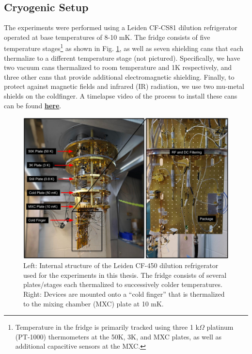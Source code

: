 

\subsection{Cryogenic Setup}

The experiments were performed using a Leiden CF-CS81 dilution refrigerator operated at base temperatures of 8-10 mK. The fridge consists of five temperature stages\footnote{Temperature in the fridge is primarily tracked using three 1 k$\Omega$ platinum (PT-1000) thermometers at the 50K, 3K, and MXC plates, as well as additional capacitive sensors at the MXC. } as shown in Fig. \ref{fig:4-fridge-wiring}, as well as seven shielding cans that each thermalize to a different temperature stage (not pictured). Specifically, we have two vacuum cans thermalized to room temperature and 1K respectively, and three other cans that provide additional electromagnetic shielding. Finally, to protect against magnetic fields and infrared (IR) radiation, we use two mu-metal shields on the coldfinger. A timelapse video of the process to install these cans can be found \href{https://youtu.be/KkvUc9Aw77s?t=829}{\textbf{here}}. 

\begin{figure}[h]
    \centering
    \includegraphics[width=0.9\linewidth]{Figures/4/Fridge-Wiring.pdf}
    \caption{Left: Internal structure of the Leiden CF-450 dilution refrigerator used for the experiments in this thesis. The fridge consists of several plates/stages each thermalized to successively colder temperatures. Right: Devices are mounted onto a ``cold finger'' that is thermalized to the mixing chamber (MXC) plate at 10 mK.}
    \label{fig:4-fridge-wiring}
\end{figure}

